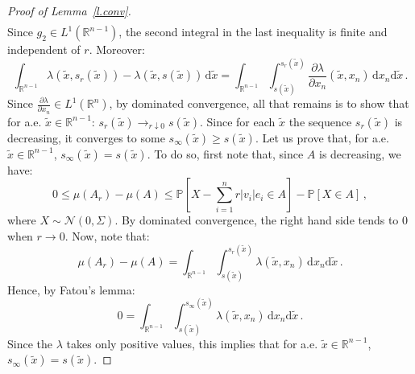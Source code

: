 \documentclass[11pt]{article}
\theoremstyle{definition}
\numberwithin{equation}{section}
\newcommand{\R}{\mathbb{R}}
\newcommand{\Pro}{\mathbb{P}}
\newcommand*\calN{\mathcal{N}}
\newcommand*{\dd}{\mathrm{d}}
\begin{document}
\begin{proof}[Proof of Lemma~\ref{l.conv}]
\begin{multline*}
\end{multline*}
Since $g_2\in L^1(\R^{n-1})$, the second integral in the last inequality is finite and independent of $r$. Moreover:
\[
\int_{\R^{n-1}}\lambda(\tilde{x},s_r(\tilde{x})) -\lambda(\tilde{x},s(\tilde{x})) \, \dd\tilde{x}=\int_{\R^{n-1}}\int_{s(\tilde{x})}^{s_r(\tilde{x})}\frac{\partial\lambda}{\partial x_n}(\tilde{x},x_n) \, \dd x_n \dd\tilde{x}\,.
\]
Since $\frac{\partial\lambda}{\partial x_n}\in L^1(\R^n)$, by dominated convergence, all that remains is to show that for a.e. $\tilde{x}\in\R^{n-1}$: $s_r(\tilde{x}) \longrightarrow_{r\downarrow 0} s(\tilde{x})$. Since for each $\tilde{x}$ the sequence $s_r(\tilde{x})$ is decreasing, it converges to some $s_\infty(\tilde{x}) \geq s(\tilde{x})$. Let us prove that, for a.e. $\tilde{x}\in\R^{n-1}$, $s_\infty(\tilde{x})=s(\tilde{x})$. To do so, first note that, since $A$ is decreasing, we have:
\[
0 \leq \mu(A_r) - \mu(A) \leq \Pro \left[X - \sum_{i=1}^n r |v_i|e_i \in A \right] - \Pro \left[X \in A \right] \,,
\]
where $X \sim \calN(0,\Sigma)$. By dominated convergence, the right hand side tends to $0$ when $r\rightarrow 0$. Now, note that:
\[
\mu(A_r)-\mu(A) = \int_{\R^{n-1}} \int_{s(\tilde{x})}^{s_r(\tilde{x})} \lambda(\tilde{x},x_n) \, \dd x_n \dd\tilde{x} \,.
\]
Hence, by Fatou's lemma:
\[
0 = \int_{\R^{n-1}} \int_{s(\tilde{x})}^{s_\infty(\tilde{x})} \lambda(\tilde{x},x_n) \, \dd x_n \dd\tilde{x} \,.
\]
Since the $\lambda$ takes only positive values, this implies that for a.e. $\tilde{x}\in\R^{n-1}$, $s_\infty(\tilde{x})=s(\tilde{x})$.
\end{proof}
\end{document}
